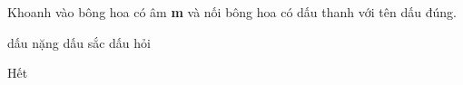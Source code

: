\documentclass[../main.tex]{subfiles}
\begin{document}
\begin{bt}
    Khoanh vào bông hoa có âm \textbf{m} và nối bông hoa có dấu thanh với tên dấu đúng.
    \par\nopagebreak\vspace{6pt}\nopagebreak
    \begin{center}
    \quad{}\quad{}\quad{}\par\bigskip
    \quad{}\quad{}\par\smallskip
    dấu nặng \qquad\qquad dấu sắc \qquad\qquad dấu hỏi
    \end{center}
\end{bt}

\begin{center}
       \faGg\faGg\quad Hết \quad\faGg\faGg
\end{center}
\end{document}
